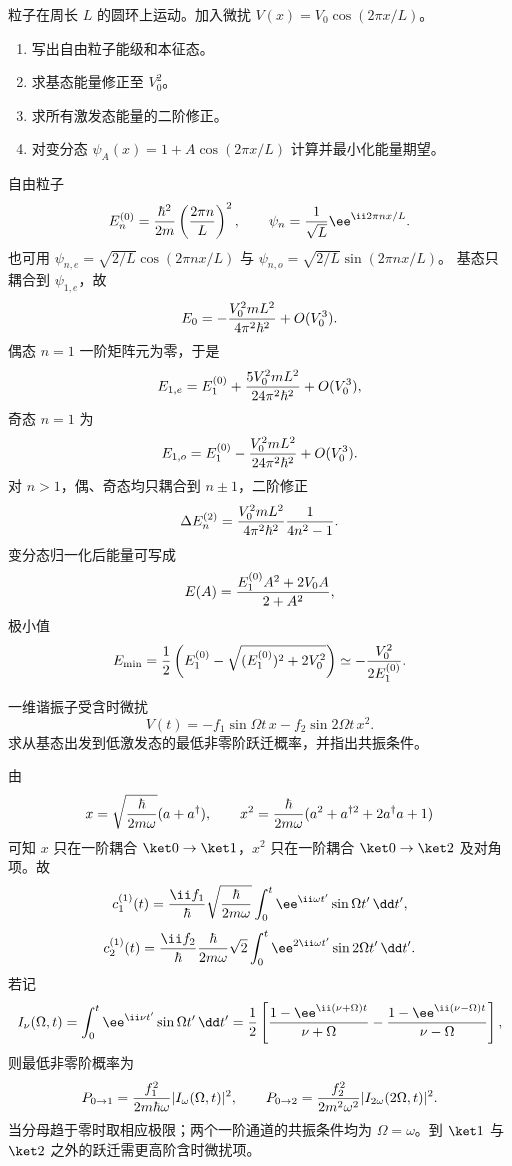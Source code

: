 
\begin{question}
粒子在周长 $L$ 的圆环上运动。加入微扰 $V(x)=V_0\cos(2\pi x/L)$。
\begin{enumerate}
  \item 写出自由粒子能级和本征态。
  \item 求基态能量修正至 $V_0^2$。
  \item 求所有激发态能量的二阶修正。
  \item 对变分态 $\psi_A(x)=1+A\cos(2\pi x/L)$ 计算并最小化能量期望。
\end{enumerate}
\begin{solution}
自由粒子
\[
  E_n^{(0)}={\hbar^2\over2m}\left({2\pi n\over L}\right)^2,\qquad
  \psi_n={1\over\sqrt L}\ee^{\ii2\pi nx/L}.
\]
也可用 $\psi_{n,e}=\sqrt{2/L}\cos(2\pi nx/L)$ 与 $\psi_{n,o}=\sqrt{2/L}\sin(2\pi nx/L)$。
基态只耦合到 $\psi_{1,e}$，故
\[
  E_0=-{V_0^2mL^2\over4\pi^2\hbar^2}+O(V_0^3).
\]
偶态 $n=1$ 一阶矩阵元为零，于是
\[
   E_{1,e}=E_1^{(0)}+{5V_0^2mL^2\over24\pi^2\hbar^2}+O(V_0^3),
\]
奇态 $n=1$ 为
\[
  E_{1,o}=E_1^{(0)}-{V_0^2mL^2\over24\pi^2\hbar^2}+O(V_0^3).
\]
对 $n>1$，偶、奇态均只耦合到 $n\pm1$，二阶修正
\[
  \Delta E_n^{(2)}={V_0^2mL^2\over4\pi^2\hbar^2}{1\over4n^2-1}.
\]
变分态归一化后能量可写成
\[
  E(A)={E_1^{(0)}A^2+2V_0A\over2+A^2},
\]
极小值
\[
  E_{\min}={1\over2}\left(E_1^{(0)}-\sqrt{(E_1^{(0)})^2+2V_0^2}\right)
  \simeq-{V_0^2\over2E_1^{(0)}}.
\]
\end{solution}
\end{question}

\begin{question}
一维谐振子受含时微扰
\[
  V(t)=-f_1\sin\Omega t\,x-f_2\sin2\Omega t\,x^2.
\]
求从基态出发到低激发态的最低非零阶跃迁概率，并指出共振条件。
\begin{solution}
由
\[
  x=\sqrt{\hbar\over2m\omega}(a+a^\dagger),\qquad
  x^2={\hbar\over2m\omega}(a^2+a^{\dagger2}+2a^\dagger a+1)
\]
可知 $x$ 只在一阶耦合 $\ket0\to\ket1$，$x^2$ 只在一阶耦合 $\ket0\to\ket2$ 及对角项。故
\[
  c_1^{(1)}(t)={\ii f_1\over\hbar}\sqrt{\hbar\over2m\omega}
  \int_0^t \ee^{\ii\omega t'}\sin\Omega t'\,\dd t',
\]
\[
  c_2^{(1)}(t)={\ii f_2\over\hbar}{\hbar\over2m\omega}\sqrt2
  \int_0^t \ee^{2\ii\omega t'}\sin2\Omega t'\,\dd t' .
\]
若记
\[
  I_\nu(\Omega,t)=\int_0^t \ee^{\ii\nu t'}\sin\Omega t'\,\dd t'
  ={1\over2}\left[
  {1-\ee^{\ii(\nu+\Omega)t}\over \nu+\Omega}
  -{1-\ee^{\ii(\nu-\Omega)t}\over \nu-\Omega}\right],
\]
则最低非零阶概率为
\[
  P_{0\to1}={f_1^2\over 2m\hbar\omega}|I_\omega(\Omega,t)|^2,\qquad
  P_{0\to2}={f_2^2\over 2m^2\omega^2}|I_{2\omega}(2\Omega,t)|^2 .
\]
当分母趋于零时取相应极限；两个一阶通道的共振条件均为
$\Omega=\omega$。到 $\ket1$ 与 $\ket2$ 之外的跃迁需更高阶含时微扰项。
\end{solution}
\end{question}

